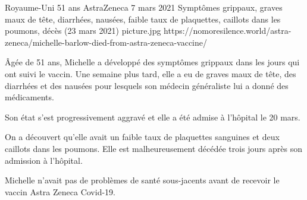 {Royaume-Uni}
{51 ans}
{AstraZeneca}
{7 mars 2021}
{Symptômes grippaux, graves maux de tête, diarrhées, nausées, faible taux de
  plaquettes, caillots dans les poumons, décès (23 mars 2021)}
{picture.jpg}
{https://nomoresilence.world/astra-zeneca/michelle-barlow-died-from-astra-zeneca-vaccine/}
{

Âgée de 51 ans, Michelle a développé des symptômes grippaux dans les jours qui
ont suivi le vaccin. Une semaine plus tard, elle a eu de graves maux de tête,
des diarrhées et des nausées pour lesquels son médecin généraliste lui a donné
des médicaments.

Son état s'est progressivement aggravé et elle a été admise à l'hôpital le 20
mars.

On a découvert qu'elle avait un faible taux de plaquettes sanguines et deux
caillots dans les poumons. Elle est malheureusement décédée trois jours après
son admission à l'hôpital.

Michelle n'avait pas de problèmes de santé sous-jacents avant de recevoir le
vaccin Astra Zeneca Covid-19.

}
